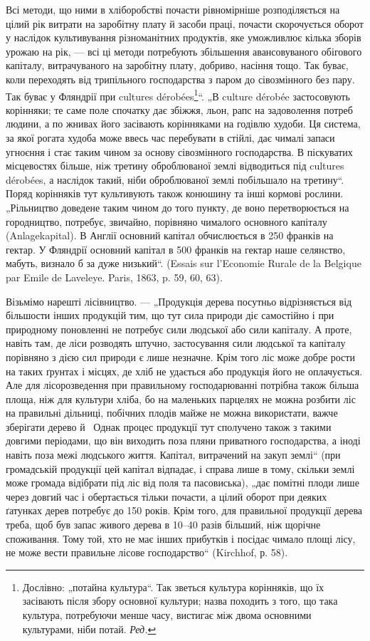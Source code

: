 Всі методи, що ними в хліборобстві почасти рівномірніше розподіляється на цілий рік витрати на
заробітну плату й засоби праці, почасти скорочується оборот у наслідок культивування різноманітних
продуктів, яке уможливлює кілька зборів урожаю на рік, — всі ці методи потребують збільшення
авансовуваного обігового капіталу, витрачуваного на заробітну плату, добриво, насіння тощо. Так
буває, коли переходять від трипільного господарства з паром до сівозмінного без пару. Так буває у
Фляндрії при cultures dérobées\footnote*{
Дослівно: „потайна культура“. Так зветься культура корінняків, що їх засівають
після збору основної культури; назва походить з того, що така культура, потребуючи менше часу,
вистигає між двома основними культурами, ніби потай. \emph{Ред.}
}“. „В culture dérobée застосовують корінняки; те саме поле спочатку
дає збіжжя, льон, рапс на задоволення потреб людини,
а по жнивах його засівають корінняками на годівлю худоби. Ця система, за якої рогата худоба
може ввесь час перебувати в стійлі, дає чималі запаси угноєння і стає таким чином за основу
сівозмінного господарства. В піскуватих місцевостях більше, ніж третину оброблюваної землі
відводиться під cultures dérobées, а наслідок такий, ніби оброблюваної землі побільшало на третину“.
Поряд корінняків тут культивують також конюшину та інші кормові рослини. „Рільництво доведене таким
чином до того пункту, де воно перетворюється на городництво, потребує, звичайно, порівняно чималого
основного капіталу (Anlagekapital). В Англії основний капітал обчислюється в 250 франків на гектар.
У Фляндрії основний капітал в 500 франків на гектар наше селянство, мабуть, визнало б за дуже
низький“. (Essais sur l’Economie Rurale de la Belgique par Emile de Laveleye. Paris, 1863, p. 59,
60, 63).

Візьмімо нарешті лісівництво. — „Продукція дерева посутньо відрізняється від більшости інших
продукцій тим, що тут сила природи діє самостійно і при природному поновленні не потребує сили
людської або сили капіталу. А проте, навіть там, де ліси розводять штучно, застосування сили
людської та капіталу порівняно з дією сил природи є лише незначне. Крім того ліс може добре рости на
таких ґрунтах і місцях, де хліб не удається або продукція його не оплачується. Але для
лісорозведення при правильному господарюванні потрібна також більша площа, ніж для культури хліба,
бо на маленьких парцелях не можна розбити ліс на правильні дільниці, побічних плодів майже не можна
використати, важче зберігати дерево й~ Однак процес продукції тут сполучено також з такими
довгими періодами, що він виходить поза пляни приватного господарства, а іноді навіть поза межі
людського життя. Капітал, витрачений на закуп землі“ (при громадській продукції
цей капітал відпадає, і справа лише в тому,
скільки землі може громада відібрати під ліс від поля та пасовиська), „дає помітні плоди лише через
довгий час і обертається тільки почасти, а цілий оборот при деяких ґатунках дерев потребує до 150
років. Крім того, для правильної продукції дерева треба, щоб був запас живого дерева в 10--40 разів
більший, ніж щорічне споживання. Тому той, хто не має інших прибутків і посідає чимало площі лісу,
не може вести правильне лісове господарство“ (Kirchhof, р. 58).


